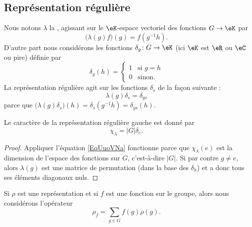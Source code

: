 \subsection{Représentation régulière}

Nous notons \( \lambda\) la , agissant sur le \( \eK\)-espace vectoriel des fonctions \( G\to \eK\) par
\begin{equation}
    \Big( \lambda(g)f \Big)(g)=f(g^{-1}h).
\end{equation}
D'autre part nous considérons les fonctions \( \delta_g\colon G\to \eK\) (ici \( \eK\) est \( \eR\) ou \( \eC\) ou pire) définie par
\begin{equation}
    \delta_g(h)=\begin{cases}
        1    &   \text{si } g=h\\
        0    &    \text{sinon.}
    \end{cases}
\end{equation}
La représentation régulière agit sur les fonctions \( \delta_s\) de la façon suivante :
\begin{equation}
    \lambda(g)\delta_s=\delta_{gs}
\end{equation}
parce que \( \big( \lambda(g)\delta_s \big)(h)=\delta_s(g^{-1}h)=\delta_{gs}(h)\).

\begin{lemma}
    Le caractère de la représentation régulière gauche est donné par
    \begin{equation}        \label{EqUuoVNa}
        \chi_{\lambda}=| G |\delta_e.
    \end{equation}
\end{lemma}

\begin{proof}
    Appliquer l'équation \eqref{EqUuoVNa} fonctionne parce que \( \chi_{\lambda}(e)\) est la dimension de l'espace des fonctions sur \( G\), c'est-à-dire \( | G |\). Si par contre \( g\neq e\), alors \( \lambda(g)\) est une matrice de permutation (dans la base des \( \delta_h\)) et a donc tous ses éléments diagonaux nuls.
\end{proof}

Si \( \rho\) est une représentation et si \( f\) est une fonction sur le groupe, alors nous considérons l'opérateur
\begin{equation}
    \rho_f=\sum_{g\in G}f(g)\rho(g).
\end{equation}

